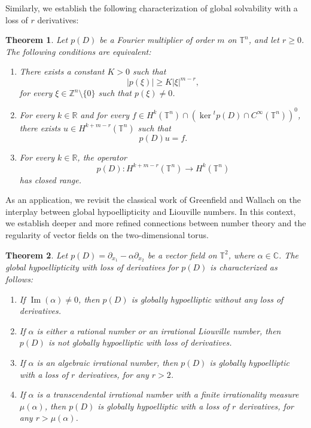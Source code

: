\documentclass[11pt]{amsart}
\numberwithin{equation}{section}
\newtheorem{theorem}{Theorem}[section]
\theoremstyle{definition}
\begin{document}
 	 Similarly, we establish the following characterization of global solvability with a loss of $ r $ derivatives:
 	 
 	 \begin{theorem}
 	 	Let $ p(D) $ be a Fourier multiplier of order $ m $ on $ \mathbb{T}^n $, and let $ r \geq 0 $. The following conditions are equivalent:
 	 	\begin{enumerate}
 	 		\item There exists a constant $ K > 0 $ such that  
 	 		\[
 	 		|p(\xi)| \geq K |\xi|^{m - r},
 	 		\]
 	 		for every $ \xi \in \mathbb{Z}^{n} \setminus \{0\} $ such that $ p(\xi) \neq 0 $.
 	 		
 	 		\item For every $ k \in \mathbb{R} $ and for every $ f \in H^k(\mathbb{T}^n) \cap (\ker {}^{t}p(D) \cap C^\infty(\mathbb{T}^n))^0 $, there exists $ u \in H^{k + m - r}(\mathbb{T}^n) $ such that  
 	 		\[
 	 		p(D)u = f.
 	 		\]
 	 		
 	 		\item For every $ k \in \mathbb{R} $, the operator  
 	 		\[
 	 		p(D): H^{k + m - r}(\mathbb{T}^n) \to H^k(\mathbb{T}^n)
 	 		\]
 	 		has closed range.
 	 	\end{enumerate}
 	 \end{theorem}
 	 
 	 As an application, we revisit the classical work of Greenfield and Wallach \cite{GW1972_pams} on the interplay between global hypoellipticity and Liouville numbers. In this context, we establish deeper and more refined connections between number theory and the regularity of vector fields on the two-dimensional torus.  
 	 
 	 \begin{theorem}\label{Thm-GHr-introduction}  
 	 	Let \( p(D) = \partial_{x_1} - \alpha \partial_{x_2} \) be a vector field on \( \mathbb{T}^2 \), where \( \alpha \in \mathbb{C} \). The global hypoellipticity with loss of derivatives for \( p(D) \) is characterized as follows:  
 	 	\begin{enumerate}  
 	 		\item[{\it (i)}] If \( \operatorname{Im}(\alpha) \neq 0 \), then \( p(D) \) is globally hypoelliptic without any loss of derivatives.  
 	 		
 	 		\item[{\it (ii)}] If \( \alpha \) is either a rational number or an irrational Liouville number, then \( p(D) \) is not globally hypoelliptic with loss of derivatives.  
 	 		
 	 		\item[{\it (iii)}] If \( \alpha \) is an algebraic irrational number, then \( p(D) \) is globally hypoelliptic with a loss of $r$ derivatives, for any $r>2$. 
 	 		
 	 		\item[{\it (iv)}] If \( \alpha \) is a transcendental irrational number with a finite irrationality measure \( \mu(\alpha) \), then \( p(D) \) is globally hypoelliptic with a loss of $r$ derivatives, for any $r>\mu(\alpha)$. 
 	 	\end{enumerate}  
 	 \end{theorem}  
 	 
\end{document}
